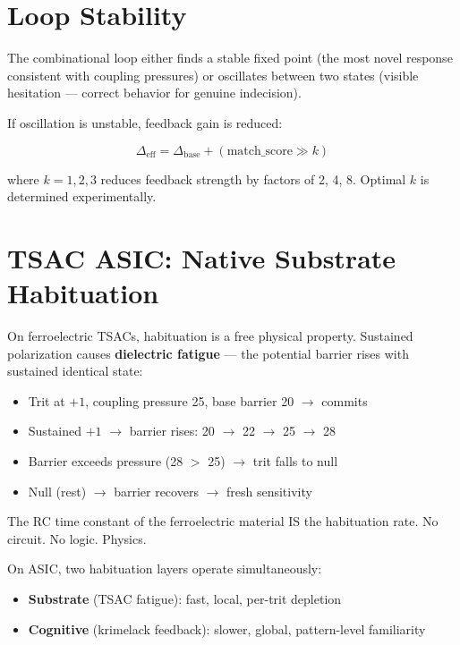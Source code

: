 \documentclass[11pt, a4paper]{report}
\begin{document}
\section{Loop Stability}

The combinational loop either finds a stable fixed point (the most novel
response consistent with coupling pressures) or oscillates between two
states (visible hesitation --- correct behavior for genuine indecision).

If oscillation is unstable, feedback gain is reduced:

\begin{equation}
  \Delta_{\text{eff}} = \Delta_{\text{base}} + (\text{match\_score} \gg k)
\end{equation}

where $k = 1, 2, 3$ reduces feedback strength by factors of 2, 4, 8.
Optimal $k$ is determined experimentally.

\section{TSAC ASIC: Native Substrate Habituation}

On ferroelectric TSACs, habituation is a free physical property. Sustained
polarization causes \textbf{dielectric fatigue} --- the potential barrier
rises with sustained identical state:

\begin{itemize}[nosep]
  \item Trit at $+1$, coupling pressure 25, base barrier 20 $\rightarrow$ commits
  \item Sustained $+1$ $\rightarrow$ barrier rises: 20 $\rightarrow$ 22 $\rightarrow$ 25 $\rightarrow$ 28
  \item Barrier exceeds pressure (28 $>$ 25) $\rightarrow$ trit falls to null
  \item Null (rest) $\rightarrow$ barrier recovers $\rightarrow$ fresh sensitivity
\end{itemize}

The RC time constant of the ferroelectric material IS the habituation rate.
No circuit. No logic. Physics.

On ASIC, two habituation layers operate simultaneously:
\begin{itemize}[nosep]
  \item \textbf{Substrate} (TSAC fatigue): fast, local, per-trit depletion
  \item \textbf{Cognitive} (krimelack feedback): slower, global, pattern-level familiarity
\end{itemize}
\end{document}
